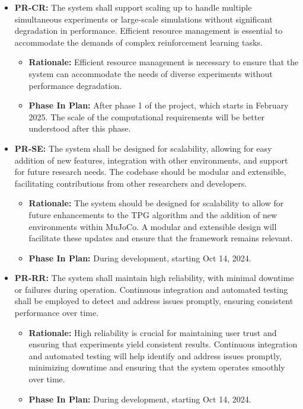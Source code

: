 \documentclass[12pt]{article}
\begin{document}
\begin{itemize}
\item \label{PR-CR} \textbf{PR-CR:} The system shall support scaling up to handle multiple simultaneous experiments or large-scale simulations without significant degradation in performance. Efficient resource management is essential to accommodate the demands of complex reinforcement learning tasks.
  \begin{itemize}
    \item \textbf{Rationale:} Efficient resource management is necessary to ensure that the system can accommodate the needs of diverse experiments without performance degradation.
    \item \textbf{Phase In Plan:} After phase 1 of the project, which starts in February 2025. The scale of the computational requirements will be better understood after this phase.
  \end{itemize}

\item \label{PR-SE} \textbf{PR-SE:} The system shall be designed for scalability, allowing for easy addition of new features, integration with other environments, and support for future research needs. The codebase should be modular and extensible, facilitating contributions from other researchers and developers.
  \begin{itemize}
    \item \textbf{Rationale:} The system should be designed for scalability to allow for future enhancements to the TPG algorithm and the addition of new environments within MuJoCo. A modular and extensible design will facilitate these updates and ensure that the framework remains relevant.
    \item \textbf{Phase In Plan:} During development, starting Oct 14, 2024.
  \end{itemize}

\item \label{PR-RR} \textbf{PR-RR:} The system shall maintain high reliability, with minimal downtime or failures during operation. Continuous integration and automated testing shall be employed to detect and address issues promptly, ensuring consistent performance over time.
  \begin{itemize}
    \item \textbf{Rationale:} High reliability is crucial for maintaining user trust and ensuring that experiments yield consistent results. Continuous integration and automated testing will help identify and address issues promptly, minimizing downtime and ensuring that the system operates smoothly over time.
    \item \textbf{Phase In Plan:} During development, starting Oct 14, 2024.
  \end{itemize}
\end{itemize}
\end{document}
